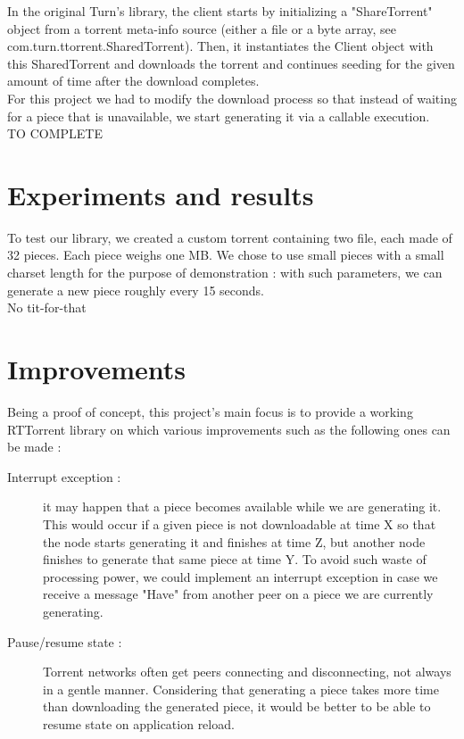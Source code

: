 \documentclass[a4paper]{article}
\begin{document}
{In the original Turn's library, the client starts by initializing a "ShareTorrent" object from a torrent meta-info source (either a file or a byte array, see com.turn.ttorrent.SharedTorrent). Then, it instantiates the Client object with this SharedTorrent and downloads the torrent and continues seeding for the given amount of time after the download completes.\\

For this project we had to modify the download process so that instead of waiting for a piece that is unavailable, we start generating it via a callable execution. \\

TO COMPLETE

\section{Experiments and results}

To test our library, we created a custom torrent containing two file, each made of 32 pieces. Each piece weighs one MB. We chose to use small pieces with a small charset length for the purpose of demonstration : with such parameters, we can generate a new piece roughly every 15 seconds.\\

No tit-for-that

\section{Improvements}

Being a proof of concept, this project's main focus is to provide a working RTTorrent library on which various improvements such as the following ones can be made :\\

\begin{description}
	\item [Interrupt exception : ] it may happen that a piece becomes available while we are generating it. This would occur if a given piece is not downloadable at time X so that the node starts generating it and finishes at time Z, but another node finishes to generate that same piece at time Y. To avoid such waste of processing power, we could implement an interrupt exception in case we receive a message "Have" from another peer on a piece we are currently generating.\\
	
	\item [Pause/resume state : ] Torrent networks often get peers connecting and disconnecting, not always in a gentle manner. Considering that generating a piece takes more time than downloading the generated piece, it would be better to be able to resume state on application reload.\\
	

\end{description}}
\end{document}
